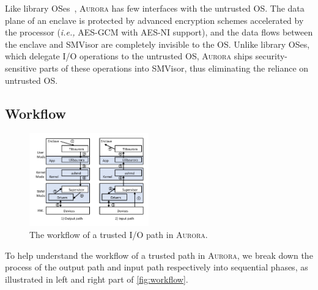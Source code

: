 Like library OSes~\cite{DBLP:journals/tocs/BaumannPH15, DBLP:conf/usenix/TsaiPV17, shinde_panoply:_2017}, \textsc{Aurora} has few interfaces with the untrusted OS. %
The data plane of an enclave is protected by advanced encryption schemes accelerated by the processor (\emph{i.e.,} AES-GCM with AES-NI support), and the data flows between the enclave and SMVisor are completely invisible to the OS. Unlike library OSes, which delegate I/O operations to the untrusted OS, \textsc{Aurora} ships security-sensitive parts of these operations into SMVisor, thus eliminating the reliance on untrusted OS.

\subsection{Workflow}\label{workflow}

\begin{figure}
	\centering
	\includegraphics[width=0.46\textwidth]{figures/workflow.pdf} %
	\caption{The workflow of a trusted I/O path in \textsc{Aurora}. }%
	\label{fig:workflow}
\end{figure}

To help understand the workflow of a trusted path in \textsc{Aurora}, we break down the process of the output path and input path respectively into sequential phases, as illustrated in left and right part of \autoref{fig:workflow}.

